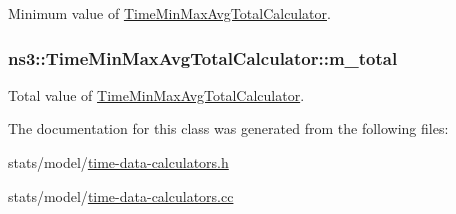 Minimum value of \hyperlink{classns3_1_1TimeMinMaxAvgTotalCalculator}{Time\+Min\+Max\+Avg\+Total\+Calculator}. 

\subsubsection[{\texorpdfstring{m\+\_\+total}{m_total}}]{ ns3\+::\+Time\+Min\+Max\+Avg\+Total\+Calculator\+::m\+\_\+total\hspace{0.3cm}{\ttfamily [protected]}}\hypertarget{classns3_1_1TimeMinMaxAvgTotalCalculator_a0f72200cefc09c0f04a249723682c6f5}{}\label{classns3_1_1TimeMinMaxAvgTotalCalculator_a0f72200cefc09c0f04a249723682c6f5}


Total value of \hyperlink{classns3_1_1TimeMinMaxAvgTotalCalculator}{Time\+Min\+Max\+Avg\+Total\+Calculator}. 



The documentation for this class was generated from the following files\+:\begin{DoxyCompactItemize}
\item 
stats/model/\hyperlink{time-data-calculators_8h}{time-\/data-\/calculators.\+h}\item 
stats/model/\hyperlink{time-data-calculators_8cc}{time-\/data-\/calculators.\+cc}\end{DoxyCompactItemize}
